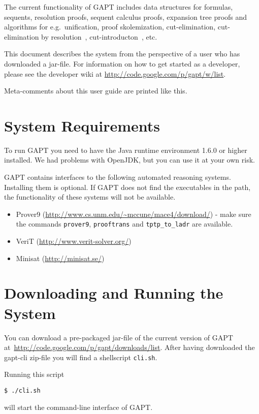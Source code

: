 \documentclass[a4paper,11pt]{article}
\newenvironment{meta}{\color{red}}{\color{black}}
\begin{document}
The current functionality of GAPT includes data structures for formulas,
sequents, resolution proofs, sequent calculus proofs, expansion tree proofs
and algorithms for e.g.\ unification, proof skolemization, cut-elimination,
cut-elimination by resolution~\cite{Baaz00CutElimination}, cut-introducton~\cite{Hetzl2012}, etc.

This document describes the system from the perspective of a user who has
downloaded a jar-file. For information on how to get started as a developer,
please see the developer wiki at \url{http://code.google.com/p/gapt/w/list}.

\begin{meta}
Meta-comments about this user guide are printed like this.
\end{meta}

\section{System Requirements}
\label{sec:sysreq}

To run GAPT you need to have the Java runtime environment 1.6.0 or higher installed. We had
problems with OpenJDK, but you can use it at your own risk.

GAPT contains interfaces to the following automated reasoning systems. Installing
them is optional. If GAPT does not find the executables in the path, the
functionality of these systems will not be available. 
%
\begin{itemize}
\item Prover9 (\url{http://www.cs.unm.edu/~mccune/mace4/download/}) - make sure
the commands \texttt{prover9}, \texttt{prooftrans} and \texttt{tptp\_to\_ladr}
are available.
\item VeriT (\url{http://www.verit-solver.org/})
\item Minisat (\url{http://minisat.se/})
\end{itemize}

\section{Downloading and Running the System}

You can download a pre-packaged jar-file of the current version of GAPT
at~\url{http://code.google.com/p/gapt/downloads/list}. After having downloaded
the gapt-cli zip-file you will find a shellscript \texttt{cli.sh}.

Running this script
\begin{lstlisting}[mathescape=false]
$ ./cli.sh
\end{lstlisting}
will start the command-line interface of GAPT.
\end{document}

